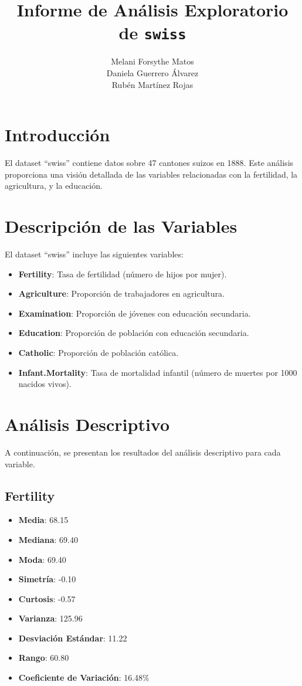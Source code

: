\documentclass{article}
\title{Informe de Análisis Exploratorio de \texttt{swiss}}
\author{
  Melani Forsythe Matos \\
  Daniela Guerrero Álvarez \\
  Rubén Martínez Rojas
}
\date{} %
\begin{document}
\maketitle

\section{Introducción}
El dataset ``swiss'' contiene datos sobre 47 cantones suizos en 1888. Este análisis proporciona una visión detallada de las variables relacionadas con la fertilidad, la agricultura, y la educación.

\section{Descripción de las Variables}
El dataset ``swiss'' incluye las siguientes variables:
\begin{itemize}
    \item \textbf{Fertility}: Tasa de fertilidad (número de hijos por mujer).
    \item \textbf{Agriculture}: Proporción de trabajadores en agricultura.
    \item \textbf{Examination}: Proporción de jóvenes con educación secundaria.
    \item \textbf{Education}: Proporción de población con educación secundaria.
    \item \textbf{Catholic}: Proporción de población católica.
    \item \textbf{Infant.Mortality}: Tasa de mortalidad infantil (número de muertes por 1000 nacidos vivos).
\end{itemize}

\section{Análisis Descriptivo}
A continuación, se presentan los resultados del análisis descriptivo para cada variable.

\subsection{Fertility}
\begin{itemize}
    \item \textbf{Media}: 68.15
    \item \textbf{Mediana}: 69.40
    \item \textbf{Moda}: 69.40
    \item \textbf{Simetría}: -0.10
    \item \textbf{Curtosis}: -0.57
    \item \textbf{Varianza}: 125.96
    \item \textbf{Desviación Estándar}: 11.22
    \item \textbf{Rango}: 60.80
    \item \textbf{Coeficiente de Variación}: 16.48\%
\end{itemize}
\end{document}
